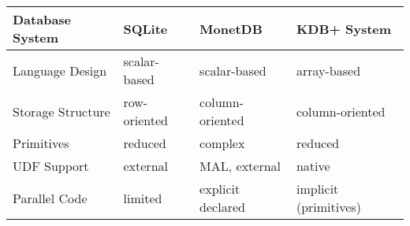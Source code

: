 \small {
\begin{table}[]
\label{my-label}
\begin{tabular}{l|lll}
Database System   & SQLite       & MonetDB           & KDB+ System           \\
\hline
Language Design   & scalar-based & scalar-based      & array-based           \\
Storage Structure & row-oriented & column-oriented   & column-oriented       \\
Primitives        & reduced      & complex           & reduced               \\
UDF Support       & external     & MAL, external     & native                \\
Parallel Code     & limited      & explicit declared & implicit (primitives)
\end{tabular}
\end{table}
}